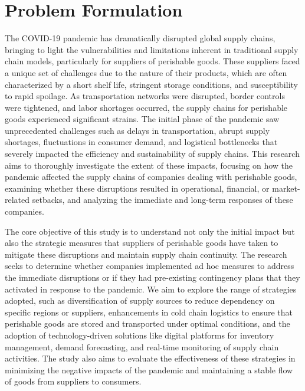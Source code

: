 \chapter{Problem Formulation}

The COVID-19 pandemic has dramatically disrupted global supply chains, bringing to light the vulnerabilities and limitations inherent in traditional supply chain models, particularly for suppliers of perishable goods. These suppliers faced a unique set of challenges due to the nature of their products, which are often characterized by a short shelf life, stringent storage conditions, and susceptibility to rapid spoilage. As transportation networks were disrupted, border controls were tightened, and labor shortages occurred, the supply chains for perishable goods experienced significant strains. The initial phase of the pandemic saw unprecedented challenges such as delays in transportation, abrupt supply shortages, fluctuations in consumer demand, and logistical bottlenecks that severely impacted the efficiency and sustainability of supply chains. This research aims to thoroughly investigate the extent of these impacts, focusing on how the pandemic affected the supply chains of companies dealing with perishable goods, examining whether these disruptions resulted in operational, financial, or market-related setbacks, and analyzing the immediate and long-term responses of these companies.

The core objective of this study is to understand not only the initial impact but also the strategic measures that suppliers of perishable goods have taken to mitigate these disruptions and maintain supply chain continuity. The research seeks to determine whether companies implemented ad hoc measures to address the immediate disruptions or if they had pre-existing contingency plans that they activated in response to the pandemic. We aim to explore the range of strategies adopted, such as diversification of supply sources to reduce dependency on specific regions or suppliers, enhancements in cold chain logistics to ensure that perishable goods are stored and transported under optimal conditions, and the adoption of technology-driven solutions like digital platforms for inventory management, demand forecasting, and real-time monitoring of supply chain activities. The study also aims to evaluate the effectiveness of these strategies in minimizing the negative impacts of the pandemic and maintaining a stable flow of goods from suppliers to consumers. 

